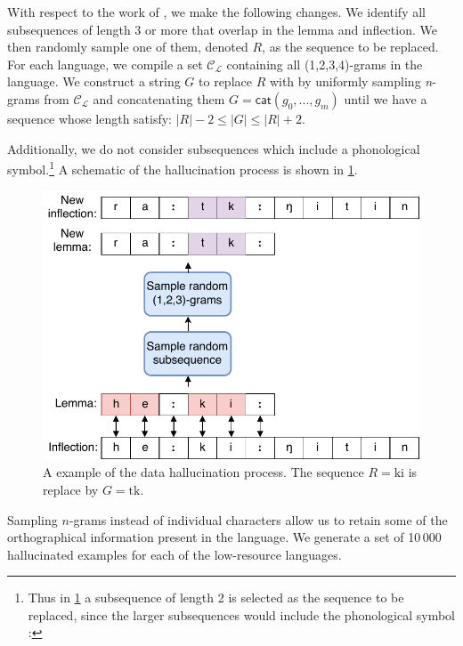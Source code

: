 \documentclass[11pt,a4paper]{article}
\begin{document}
With respect to the work of \citet{DBLP:conf/emnlp/AnastasopoulosN19},
we make the following changes. We identify all subsequences of length
$3$ or more that overlap in the lemma and inflection. We then randomly
sample one of them, denoted $R$, as the sequence to be replaced.  For
each language, we compile a set $\mathcal{C_L}$ containing all
(1,2,3,4)-grams in the language. We construct a string $G$ to replace
$R$ with by uniformly sampling \textit{n}-grams from $\mathcal{C_L}$
and concatenating them $G = \mathsf{cat}(g_0, ..., g_m)$ until we have
a sequence whose length satisfy: $|R|-2 \leq |G| \leq |R|+2$.



Additionally, we do not consider subsequences which include a
phonological symbol.\footnote{Thus in \cref{fig:hall} a subsequence of
length 2 is selected as the sequence to be replaced, since the larger subsequences
would include the phonological symbol :}  A schematic of the hallucination
process is shown in \cref{fig:hall}.


\begin{figure}[h]
\centering
\includegraphics[scale=0.5]{hall.pdf}
\caption{\label{fig:hall} A example of the data hallucination process. The sequence $R=\text{ki}$ is replace by $G=\text{tk}$.}
\end{figure}


Sampling $n$-grams instead of individual characters allow us to retain
some of the orthographical information present in the
language.  We generate a set of 10\,000 hallucinated examples for each
of the low-resource languages.
\end{document}
